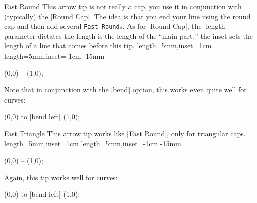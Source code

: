 \begin{arrowcap}{Fast Round}
  {
    This arrow tip is not really a cap, you use it in conjunction with
    (typically) the |Round Cap|. The idea is that you end your line
    using the round cap and then add several \texttt{Fast
      Round}s. As for |Round Cap|, the |length| parameter
    dictates the length is the length of the ``main part,'' the
    inset sets the length of a line that comes before this tip.
  }
  {length=5mm,inset=1cm}
  {length=5mm,inset=-1cm}
  {-15mm}
  
\begin{codeexample}[]
\tikz \draw [line width=1ex,
             -{Round Cap []. Fast Round[] Fast Round[]}]
  (0,0) -- (1,0);             
\end{codeexample}
  Note that in conjunction with the |bend| option, this works even
  quite well for curves:
\begin{codeexample}[]
\tikz [f/.tip = Fast Round] %
  \draw [line width=1ex, -{[bend] Round Cap[] . f f f}]
  (0,0) to [bend left] (1,0);             
\end{codeexample}
  
  \begin{arrowcapexamples}
    \arrowcapexample[]
    \arrowcapexample[reversed]
    \arrowcapexample[cap angle=60]
    \arrowcapexample[cap angle=60,inset=5pt]
    \arrowcapexample[length=.5ex]
    \arrowcapexample[slant=.3]
  \end{arrowcapexamples}
\end{arrowcap}


\begin{arrowcap}{Fast Triangle}
  {
    This arrow tip works like |Fast Round|, only for triangular caps. 
  }
  {length=5mm,inset=1cm}
  {length=5mm,inset=-1cm}
  {-15mm}
  
\begin{codeexample}[]
\tikz \draw [line width=1ex,
             -{Triangle Cap []. Fast Triangle[] Fast Triangle[]}]
  (0,0) -- (1,0);             
\end{codeexample}
  Again, this tip works well for curves:
\begin{codeexample}[]
\tikz [f/.tip = Fast Triangle] %
  \draw [line width=1ex, -{[bend] Triangle Cap[] . f f f}]
  (0,0) to [bend left] (1,0);             
\end{codeexample}
  
  \begin{arrowcapexamples}
    \arrowcapexample[]
    \arrowcapexample[reversed]
    \arrowcapexample[cap angle=60]
    \arrowcapexample[cap angle=60,inset=5pt]
    \arrowcapexample[length=.5ex]
    \arrowcapexample[slant=.3]
  \end{arrowcapexamples}
\end{arrowcap}



